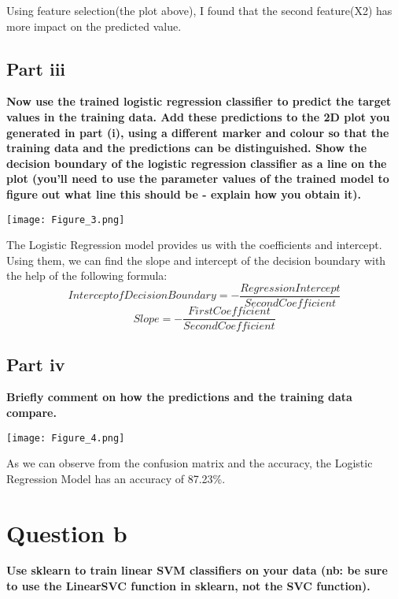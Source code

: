 \documentclass[10pt]{article}
\begin{document}
Using feature selection(the plot above), I found that the second feature(X2) has more impact on the predicted value.


\subsection*{Part iii}
\textbf{Now use the trained logistic regression classifier to predict the target values
in the training data. Add these predictions to the 2D plot you generated in
part (i), using a different marker and colour so that the training data and the
predictions can be distinguished. Show the decision boundary of the logistic
regression classifier as a line on the plot (you’ll need to use the parameter values
of the trained model to figure out what line this should be - explain how you
obtain it).}
\vspace{1mm}

\begin{center}
  \texttt{[image: Figure\_3.png]}
\end{center}

The Logistic Regression model provides us with the coefficients and intercept. Using them, we can find the slope and intercept of the decision boundary with the help of the following formula: 
\begin{equation*}
  Intercept of Decision Boundary = -\frac{Regression Intercept}{Second Coefficient}
\end{equation*}
\begin{equation*}
  Slope = -\frac{First Coefficient}{Second Coefficient}
\end{equation*}

\subsection*{Part iv}
\textbf{Briefly comment on how the predictions and the training data compare.}
\vspace{1mm}

\begin{center}
  \texttt{[image: Figure\_4.png]}
\end{center}
As we can observe from the confusion matrix and the accuracy, the Logistic Regression Model has an accuracy of 87.23{\%}.

\section*{Question b}
\textbf{Use sklearn to train linear SVM classifiers on your data (nb: be sure to use the
LinearSVC function in sklearn, not the SVC function).}
\end{document}
